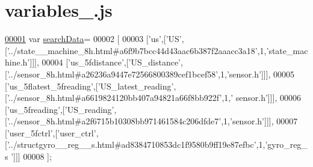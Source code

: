 \hypertarget{variables__14_8js_source}{}\section{variables\+\_.\+js}
\label{variables__14_8js_source}

\begin{DoxyCode}
\hypertarget{variables__14_8js_source.tex_l00001}{}\hyperlink{variables__14_8js_ad01a7523f103d6242ef9b0451861231e}{00001} var \hyperlink{variables__14_8js_ad01a7523f103d6242ef9b0451861231e}{searchData}=
00002 [
00003   [\textcolor{stringliteral}{'us'},[\textcolor{stringliteral}{'US'},[\textcolor{stringliteral}{'../state\_\_machine\_8h.html#a6f9b7bcc44d43aac6b387f2aaacc3a18'},1,\textcolor{stringliteral}{'state\_machine.h'}]]],
00004   [\textcolor{stringliteral}{'us\_5fdistance'},[\textcolor{stringliteral}{'US\_distance'},[\textcolor{stringliteral}{'../sensor\_8h.html#a26236a9447e72566800389cef1bcef58'},1,\textcolor{stringliteral}{'sensor.h'}]]],
00005   [\textcolor{stringliteral}{'us\_5flatest\_5freading'},[\textcolor{stringliteral}{'US\_latest\_reading'},[\textcolor{stringliteral}{'../sensor\_8h.html#a6619824120bb407a94821a66f8bb922f'},1,\textcolor{stringliteral}{'
      sensor.h'}]]],
00006   [\textcolor{stringliteral}{'us\_5freading'},[\textcolor{stringliteral}{'US\_reading'},[\textcolor{stringliteral}{'../sensor\_8h.html#a2f6715b10308bb971461584c206dfde7'},1,\textcolor{stringliteral}{'sensor.h'}]]],
00007   [\textcolor{stringliteral}{'user\_5fctrl'},[\textcolor{stringliteral}{'user\_ctrl'},[\textcolor{stringliteral}{'../structgyro\_\_reg\_\_s.html#ad8384710853dc1f9580b9ff19e87efbc'},1,\textcolor{stringliteral}{'gyro\_reg\_s
      '}]]]
00008 ];
\end{DoxyCode}
